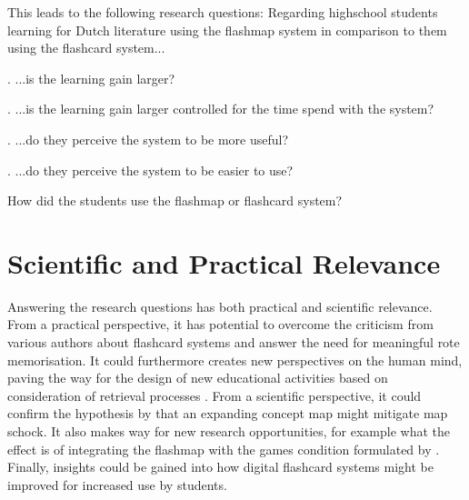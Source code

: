 This leads to the following research questions: Regarding highschool students learning for Dutch literature using the flashmap system in comparison to them using the flashcard system...

\label{benefit}
\label{effectiveness}
. ...is the learning gain larger?

\label{efficiency}
. ...is the learning gain larger controlled for the time spend with the system?

\label{perception}
\label{usefulness}
. ...do they perceive the system to be more useful?

\label{ease}
. ...do they perceive the system to be easier to use?

\label{howused}
 How did the students use the flashmap or flashcard system?

\section{Scientific and Practical Relevance}

Answering the research questions has both practical and scientific relevance. From a practical perspective, it has potential to overcome the criticism from various authors about flashcard systems and answer the need for meaningful rote memorisation. It could furthermore creates new perspectives on the human mind, paving the way for the design of new educational activities based on consideration of retrieval processes \cite{karpicke2}. From a scientific perspective, it could confirm the hypothesis by  that an expanding concept map might mitigate map schock. It also makes way for new research opportunities, for example what the effect is of integrating the flashmap with the games condition formulated by . Finally, insights could be gained into how digital flashcard systems might be improved for increased use by students.

